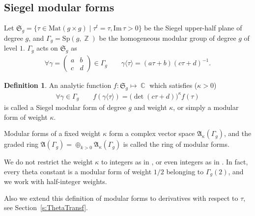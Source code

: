 \documentclass[twoside]{amsart}
\newcommand{\Mat}{\mathrm{Mat}}
\newcommand{\ImR}{\mathrm{Im}\,}
\DeclareMathOperator{\Complex}{\mathbb{C}}
\DeclareMathOperator{\Integer}{\mathbb{Z}}
\theoremstyle{definition}
\newtheorem{Def}{Definition}
\theoremstyle{plain}
\begin{document}
\subsection{Siegel modular forms}
Let $\mathfrak{S}_g = \{\tau \in \Mat(g\times g) \mid \tau^t = \tau, \ImR \tau >0\}$ 
be the Siegel upper-half plane of degree $g$, and
$\Gamma_g = \mathrm{Sp}(g,\Integer)$ be the homogeneous modular group
of degree $g$ of level $1$.  $\Gamma_g$ acts on $\mathfrak{S}_g$ as
\begin{gather}\label{MGActTau}
\forall \gamma = \begin{pmatrix}
  a & b \\ c & d
 \end{pmatrix}  \in  \Gamma_g \qquad
 \gamma \langle \tau \rangle = (a \tau + b) (c \tau + d)^{-1}.
\end{gather}

\begin{Def}
An analytic function $f: \mathfrak{S}_g \mapsto \Complex$  which satisfies ($\kappa>0$)
\begin{gather}\label{MGActTau}
\forall \gamma \in \Gamma_g  \qquad  
f( \gamma \langle \tau \rangle ) = \big( \det(c \tau +d) \big)^\kappa f(\tau) 
\end{gather}
is called a Siegel modular form 
of degree $g$ and weight $\kappa$, or simply a modular form of weight $\kappa$.
\end{Def}
Modular forms of a fixed weight $\kappa$ form a complex vector space
$\mathfrak{A}_\kappa(\Gamma_g)$, and the graded ring 
$\mathfrak{A}(\Gamma_g) = \oplus_{k>0} \mathfrak{A}_\kappa(\Gamma_g)$
is called the ring of modular forms.

We do not restrict the weight $\kappa$ to integers as in \cite{Ig1964}, 
or even integers as in \cite{Tsu1986}. 
In fact, every theta constant is a modular form of weight $1/2$ belonging to $\Gamma_g(2)$, 
and we work with
half-integer weights. 

Also we extend this definition of modular forms to derivatives with respect to $\tau$,
see Section~\ref{s:ThetaTransf}.
\end{document}
